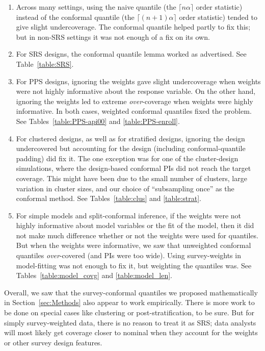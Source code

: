 \documentclass[10.5pt, letterpaper]{article}
\numberwithin{table}{section}
\numberwithin{figure}{section}
\numberwithin{equation}{section}
\begin{document}
\begin{enumerate}
  \item Across many settings, using the naive quantile (the $\lceil n\alpha\rceil$ order statistic) instead of the conformal quantile (the $\lceil (n+1)\alpha\rceil$ order statistic) tended to give slight undercoverage. The conformal quantile helped partly to fix this; but in non-SRS settings it was not enough of a fix on its own.
  \item For SRS designs, the conformal quantile lemma worked as advertised. See Table~\ref{table:SRS}.
  \item For PPS designs, ignoring the weights gave slight undercoverage when weights were not highly informative about the response variable. On the other hand, ignoring the weights led to extreme \emph{over}-coverage when weights were highly informative. In both cases, weighted conformal quantiles fixed the problem. See Tables~\ref{table:PPS-api00} and \ref{table:PPS-enroll}.
  \item For clustered designs, as well as for stratified designs, ignoring the design undercovered but accounting for the design (including conformal-quantile padding) did fix it. The one exception was for one of the cluster-design simulations, where the design-based conformal PIs did not reach the target coverage. This might have been due to the small number of clusters, large variation in cluster sizes, and our choice of ``subsampling once'' as the conformal method. See Tables~\ref{table:clus} and \ref{table:strat}.
  \item For simple models and split-conformal inference,
if the weights were not highly informative about model variables or the fit of the model,
then it did not make much difference whether or not the weights were used for quantiles.
But when the weights were informative,
we saw that unweighted conformal quantiles \emph{over}-covered (and PIs were too wide).
Using survey-weights in model-fitting was not enough to fix it,
but weighting the quantiles was. See Tables~\ref{table:model_covg} and \ref{table:model_len}.
\end{enumerate}

Overall, we saw that the survey-conformal quantiles
we proposed mathematically in Section~\ref{sec:Methods}
also appear to work empirically.
There is more work to be done on special cases like clustering or post-stratification, to be sure.
But for simply survey-weighted data, there is no reason to treat it as SRS;
data analysts will most likely get coverage closer to nominal when they account for the weights or other survey design features.
\end{document}
